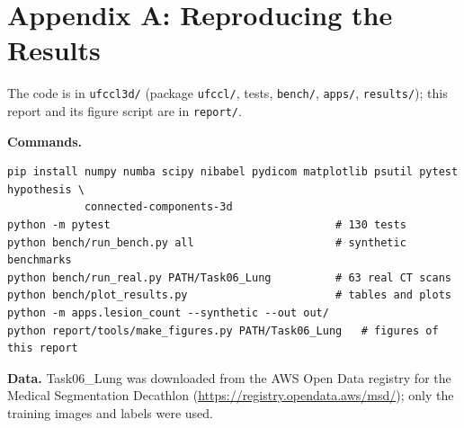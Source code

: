 \documentclass[11pt,a4paper]{article}
\begin{document}
\clearpage
\appendix
\section*{Appendix A: Reproducing the Results}
{}
The code is in \texttt{ufccl3d/} (package \texttt{ufccl/}, tests, \texttt{bench/}, \texttt{apps/}, \texttt{results/}); this report and its figure script are in \texttt{report/}.

\textbf{Commands.}
\begin{lstlisting}[numbers=none,frame=leftline,xleftmargin=6pt]
pip install numpy numba scipy nibabel pydicom matplotlib psutil pytest hypothesis \
            connected-components-3d
python -m pytest                                   # 130 tests
python bench/run_bench.py all                      # synthetic benchmarks
python bench/run_real.py PATH/Task06_Lung          # 63 real CT scans
python bench/plot_results.py                       # tables and plots
python -m apps.lesion_count --synthetic --out out/
python report/tools/make_figures.py PATH/Task06_Lung   # figures of this report
\end{lstlisting}

\textbf{Data.} Task06\_Lung was downloaded from the AWS Open Data registry for the Medical Segmentation Decathlon (\url{https://registry.opendata.aws/msd/}); only the training images and labels were used.
\end{document}
